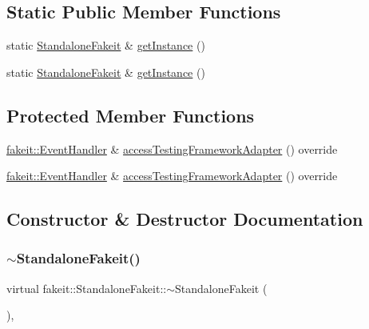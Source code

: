 \subsection*{Static Public Member Functions}
\begin{DoxyCompactItemize}
\item 
static \mbox{\hyperlink{classfakeit_1_1StandaloneFakeit}{Standalone\+Fakeit}} \& \mbox{\hyperlink{classfakeit_1_1StandaloneFakeit_a241a8b4b522c7cfcfd74bcf282406c8e}{get\+Instance}} ()
\item 
static \mbox{\hyperlink{classfakeit_1_1StandaloneFakeit}{Standalone\+Fakeit}} \& \mbox{\hyperlink{classfakeit_1_1StandaloneFakeit_a241a8b4b522c7cfcfd74bcf282406c8e}{get\+Instance}} ()
\end{DoxyCompactItemize}
\subsection*{Protected Member Functions}
\begin{DoxyCompactItemize}
\item 
\mbox{\hyperlink{structfakeit_1_1EventHandler}{fakeit\+::\+Event\+Handler}} \& \mbox{\hyperlink{classfakeit_1_1StandaloneFakeit_ad6679af7148f1be2f8276bd6adf5bea2}{access\+Testing\+Framework\+Adapter}} () override
\item 
\mbox{\hyperlink{structfakeit_1_1EventHandler}{fakeit\+::\+Event\+Handler}} \& \mbox{\hyperlink{classfakeit_1_1StandaloneFakeit_ad6679af7148f1be2f8276bd6adf5bea2}{access\+Testing\+Framework\+Adapter}} () override
\end{DoxyCompactItemize}


\subsection{Constructor \& Destructor Documentation}
\mbox{\label{classfakeit_1_1StandaloneFakeit_a898209586fd0a76a61eb20c0e178a2cd}} 
\subsubsection{\texorpdfstring{$\sim$StandaloneFakeit()}{~StandaloneFakeit()}\hspace{0.1cm}{\footnotesize\ttfamily [1/2]}}
{\footnotesize\ttfamily virtual fakeit\+::\+Standalone\+Fakeit\+::$\sim$\+Standalone\+Fakeit (\begin{DoxyParamCaption}{ }\end{DoxyParamCaption})\hspace{0.3cm}{\ttfamily [virtual]}, {\ttfamily [default]}}

